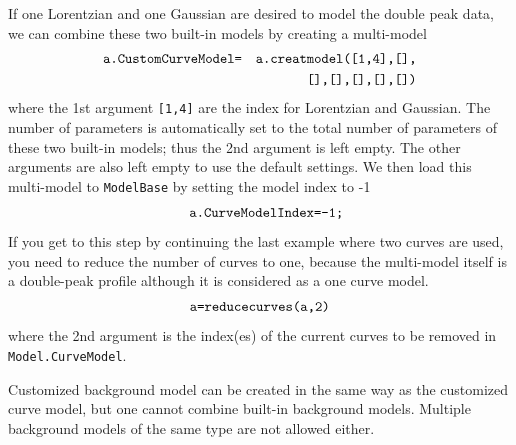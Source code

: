 \documentclass[reprint,showpacs,prb,nofootinbib,amsmath,amssymb]{revtex4-1}
\begin{document}
If one Lorentzian and one Gaussian are desired to model the double peak data, we can combine these two built-in models by creating a multi-model
\begin{eqnarray*}
	\verb|a.CustomCurveModel=|&&\verb|a.creatmodel([1,4],[],|\\
	&&\verb|[],[],[],[],[])|
\end{eqnarray*}
where the 1st argument \verb|[1,4]| are the index for Lorentzian and Gaussian. The number of parameters is automatically set to the total number of parameters of these two built-in models; thus the 2nd argument is left empty. The other arguments are also left empty to use the default settings. We then load this multi-model to \verb|ModelBase| by setting the model index to -1
\begin{eqnarray*}
	&&\verb|a.CurveModelIndex=-1;| 
\end{eqnarray*}
If you get to this step by continuing the last example where two curves are used, you need to reduce the number of curves to one, because the multi-model itself is a double-peak profile although it is considered as a one curve model.
\begin{eqnarray*}
\verb|a=reducecurves(a,2)|
\end{eqnarray*}
where the 2nd argument is the index(es) of the current curves to be removed in \verb|Model.CurveModel|.

Customized background model can be created in the same way as the customized curve model, but one cannot combine built-in background models. Multiple background models of the same type are not allowed either.
\end{document}
